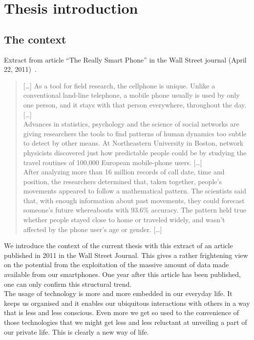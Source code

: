 \chapter{Thesis introduction}

\section{The context}

Extract from article ``The Really Smart Phone'' in the Wall Street journal (April 22, 2011)~\cite{really-smart-phone}.

\begin{quotation}
  [\dots]
  As a tool for field research, the cellphone is unique. Unlike a
  conventional land-line telephone, a mobile phone usually is used by
  only one person, and it stays with that person everywhere,
  throughout the day.
  [\dots]\\

  Advances in statistics, psychology and the
  science of social networks are giving researchers the tools to find
  patterns of human dynamics too subtle to detect by other means. At
  Northeastern University in Boston, network physicists discovered
  just how predictable people could be by studying the travel routines
  of 100,000 European mobile-phone users.
  [\dots]\\

  After analyzing more than
  16 million records of call date, time and position, the researchers
  determined that, taken together, people's movements appeared to
  follow a mathematical pattern. The scientists said that, with enough
  information about past movements, they could forecast someone's
  future whereabouts with 93.6\% accuracy.
  The pattern held true whether people stayed close to home or
  traveled widely, and wasn't affected by the phone user's age or
  gender.
  [\dots]\\
\end{quotation}

We introduce the context of the current thesis with this extract of an article published in 2011 in the Wall Street Journal.
This gives a rather frightening view on the potential from the exploitation of the massive amount of data made available from our smartphones.
One year after this article has been published, one can only confirm this structural trend.\\

The usage of technology is more and more embedded in our everyday life.
It keeps us organised and it enables our ubiquitous interactions with others in a way that is less and less conscious.
Even more we get so used to the convenience of those technologies that we might get less and less reluctant at unveiling a part of our private life.
This is clearly a new way of life.\\

